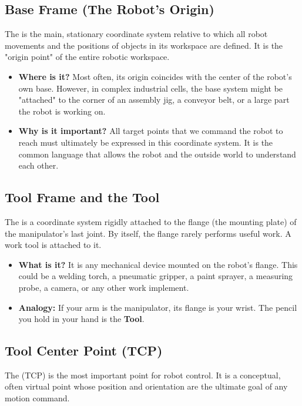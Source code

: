 \subsection{Base Frame (The Robot's Origin)}

The  is the main, stationary coordinate system relative to which all robot movements and the positions of objects in its workspace are defined. It is the "origin point" of the entire robotic workspace.

\begin{itemize}
    \item \textbf{Where is it?} Most often, its origin coincides with the center of the robot's own base. However, in complex industrial cells, the base system might be "attached" to the corner of an assembly jig, a conveyor belt, or a large part the robot is working on.
    \item \textbf{Why is it important?} All target points that we command the robot to reach must ultimately be expressed in this coordinate system. It is the common language that allows the robot and the outside world to understand each other.
\end{itemize}

\subsection{Tool Frame and the Tool}
The  is a coordinate system rigidly attached to the flange (the mounting plate) of the manipulator's last joint. By itself, the flange rarely performs useful work. A work tool is attached to it.

\begin{itemize}
    \item \textbf{What is it?} It is any mechanical device mounted on the robot's flange. This could be a welding torch, a pneumatic gripper, a paint sprayer, a measuring probe, a camera, or any other work implement.
    \item \textbf{Analogy:} If your arm is the manipulator, its flange is your wrist. The pencil you hold in your hand is the \textbf{Tool}.
\end{itemize}

\subsection{Tool Center Point (TCP)}
The  (TCP) is the most important point for robot control. It is a conceptual, often virtual point whose position and orientation are the ultimate goal of any motion command.


